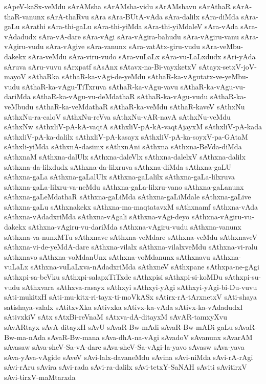 {sApeV-kaSx-veMdu
sArAMsha
sArAMsha-vidu
sArAMshavu
sArAthaR
sArA-thaR-vanunx
sArA-thaRvu
sAra
sAra-BUtA-vAda
sAra-dalilx
sAra-diMda
sAra-gaLu
sArathi
sAra-thi-gaLu
sAra-thi-yiMda
sAra-thi-yiMdaleV
sAra-vAda
sAra-vAdadudx
sAra-vA-dare
sAra-vAgi
sAra-vAgira-bahudu
sAra-vAgiru-vanu
sAra-vAgiru-vudu
sAra-vAgive
sAra-vanunx
sAra-vatAtx-giru-vudu
sAra-veMbu-dakekx
sAra-veMdu
sAra-viru-vudo
sAra-vuLaLx
sAra-vu-LaLxdudx
sAri-yAda
sAruva
sAru-vuvu
sArxpatf
sAsAnx
sAtavx-na-Bi-vayxketxV
sAtayx-setxV-joV-mayoV
sAthaRka
sAthaR-ka-vAgi-de-yeMdu
sAthaR-ka-vAgutatx-ve-yeMbu-vudu
sAthaR-ka-vAgu-TiTxruva
sAthaR-ka-vAgu-vavu
sAthaR-ka-vAgu-vu-dariMda
sAthaR-ka-vAgu-vu-deMdathaR
sAthaR-ka-vAgu-vudu
sAthaR-ka-veMbudu
sAthaR-ka-veMdathaR
sAthaR-ka-veMdu
sAthaR-kaveV
sAthxNu
sAthxNu-ra-caloV
sAthxNu-reVva
sAthxNu-vAR-navA
sAthxNu-veMdu
sAthxNw
sAthxliV-pA-kA-vaqtA
sAthxliV-pA-kA-vaqtAjayxM
sAthxliV-pA-kada
sAthxliV-pA-ka-dalilx
sAthxliV-pA-kasayx
sAthxliV-pA-ka-soyxV-pa-GAtaM
sAthxli-yiMda
sAthxnA-dasimx
sAthxnAni
sAthxna
sAthxna-BeVda-diMda
sAthxnaM
sAthxna-dalUlx
sAthxna-daleVlx
sAthxna-dalelxV
sAthxna-dalilx
sAthxna-da-lilxdudx
sAthxna-da-lilxruva
sAthxna-diMda
sAthxna-gaLU
sAthxna-gaLa
sAthxna-gaLalUlx
sAthxna-gaLalilx
sAthxna-gaLa-lilxruva
sAthxna-gaLa-lilxru-va-neMdu
sAthxna-gaLa-lilxru-vano
sAthxna-gaLanunx
sAthxna-gaLeMdathaR
sAthxna-gaLiMda
sAthxna-gaLiMdale
sAthxna-gaLive
sAthxna-gaLu
sAthxnakekx
sAthxna-ma-maqtatavxM
sAthxnamf
sAthxna-vAda
sAthxna-vAdadxriMda
sAthxna-vAgali
sAthxna-vAgi-deyo
sAthxna-vAgiru-vu-dakekx
sAthxna-vAgiru-vu-dariMda
sAthxna-vAgiru-vudu
sAthxna-vanunx
sAthxna-va-nunxMTu
sAthxnave
sAthxna-veMdare
sAthxna-veMdu
sAthxnaveV
sAthxna-vi-de-yeMdA-dare
sAthxna-vilalx
sAthxna-vilalxveMdu
sAthxna-vi-ralu
sAthxnavo
sAthxna-voMdanUnx
sAthxna-voMdanunx
sAthxnavu
sAthxna-vuLaLx
sAthxna-vuLaLxva-nAdadxriMda
sAthxneV
sAthxpane
sAthxpa-ne-gAgi
sAthxpi-sa-beVku
sAthxpi-salapxTiTxde
sAthxpisi
sAthxpi-si-koMDu
sAthxpi-su-vudu
sAthxvara
sAthxva-rasayx
sAthxyi
sAthxyi-yAgi
sAthxyi-yAgi-bi-Du-vuvu
sAti-mukitxH
sAti-mu-kitx-ri-tayx-ti-moVkASx
sAtirx-rA-tArxnetxV
sAti-shaya
satishaya-valalx
sAtitxvXka
sAtivxka
sAtivx-ka-vAda
sAtivx-ka-vAdadudxI
sAtivxkiV
sAtx
sAtxBi-reVnaM
sAtxva-dA-ditayxM
sAvAR-tamxyXvu
sAvARtayx
sAvA-ditayxH
sAvU
sAvaR-Bw-mAdi
sAvaR-Bw-mADi-gaLu
sAvaR-Bw-ma-nAda
sAvaR-Bw-mana
sAva-dhA-na-vAgi
sAvadoV
sAvanunx
sAvarAM
sAvasaw
sAva-sheV-Sa-vA-dare
sAva-sheV-Sa-vAgi-la-yavo
sAvasw
sAva-yava
sAva-yAva-vAgide
sAveV
sAvi-lalx-davaneMdu
sAvina
sAvi-niMda
sAvi-rA-rAgi
sAvi-rAru
sAvira
sAvi-rada
sAvi-ra-dalilx
sAvi-tetxY-SaNAH
sAviti
sAvitirxV
sAvi-tirxV-maMtarxda
}
